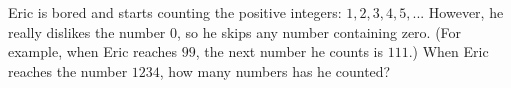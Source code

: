 Eric is bored and starts counting the positive integers: $1, 2, 3, 4, 5,... $ However, he really dislikes the number $0$, so he skips any number containing zero. (For example, when Eric reaches $99$, the next number he counts is $111$.) When Eric reaches the number $1234$, how many numbers has he counted?
